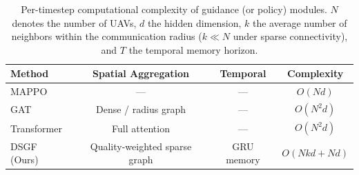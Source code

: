 %

\begin{table}[!t]
\centering
\caption{Per-timestep computational complexity of guidance (or policy) modules.
$N$ denotes the number of UAVs, $d$ the hidden dimension, $k$ the average number of
neighbors within the communication radius ($k\ll N$ under sparse connectivity),
and $T$ the temporal memory horizon.}
\label{tab:complexity}
\begin{tabular}{lccc}
\toprule
\textbf{Method} & \textbf{Spatial Aggregation} & \textbf{Temporal} & \textbf{Complexity} \\
\midrule
MAPPO & --- & --- & $O(Nd)$ \\
GAT & Dense / radius graph & --- & $O(N^{2}d)$ \\
Transformer & Full attention & --- & $O(N^{2}d)$ \\
DSGF (Ours) & Quality-weighted sparse graph & GRU memory & $O(Nkd + Nd)$ \\
\bottomrule
\end{tabular}
\end{table}


